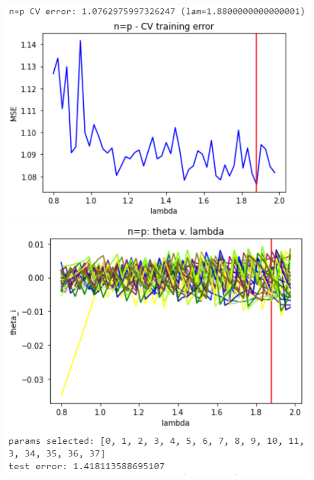 \documentclass[11pt]{article}
\begin{document}
\begin{center}
\includegraphics[scale=0.7]{charts/bgd_corr_n_eq_p_err.PNG}
\includegraphics[scale=0.7]{charts/bgd_corr_n_eq_p_thetas.PNG}


\end{center}
\end{document}

